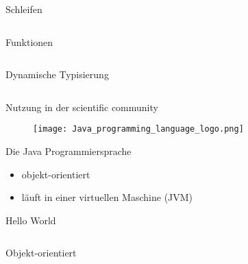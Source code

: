 \documentclass[aspectratio=169]{beamer}
\begin{document}
\begin{frame}{Schleifen}
  \inputminted[linenos]{python}{examples/loops.py}
\end{frame}

\begin{frame}{Funktionen}
  \inputminted[linenos]{python}{examples/functions.py}
\end{frame}

\begin{frame}{Dynamische Typisierung}
  \inputminted[linenos,fontsize=\scriptsize]{python}{examples/dynamic_typing.py}
\end{frame}

\begin{frame}{Nutzung in der scientific community}
\end{frame}

\begin{frame}{}
  \begin{figure}
    \centering
    \texttt{[image: Java\_programming\_language\_logo.png]}
    \caption{\cite{java_logo}}
    \label{fig:java_logo}
  \end{figure}
\end{frame}

\begin{frame}{Die Java Programmiersprache}
  \begin{itemize}
  \item objekt-orientiert
  \item läuft in einer virtuellen Maschine (JVM)
  \end{itemize}
\end{frame}

\begin{frame}{Hello World}
  \inputminted[linenos]{java}{examples/HelloWorld.java}
\end{frame}

\begin{frame}{Objekt-orientiert}
  \inputminted[linenos,fontsize=\scriptsize]{java}{examples/Inheritance.java}
\end{frame}
\end{document}
